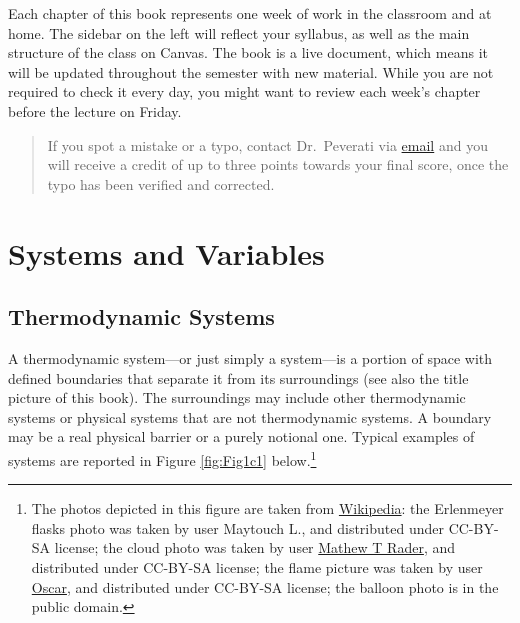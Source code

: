 \documentclass[
  9pt,
]{extbook}
\let\origdoublepage\cleardoublepage
\newcommand{\clearemptydoublepage}{%
  \clearpage
  {\pagestyle{empty}\origdoublepage}%
}
\let\cleardoublepage\clearemptydoublepage
\theoremstyle{definition}
\theoremstyle{definition}
\theoremstyle{definition}
\theoremstyle{remark}
\begin{document}
Each chapter of this book represents one week of work in the classroom and at home. The sidebar on the left will reflect your syllabus, as well as the main structure of the class on Canvas. The book is a live document, which means it will be updated throughout the semester with new material. While you are not required to check it every day, you might want to review each week's chapter before the lecture on Friday.

\begin{quote}
If you spot a mistake or a typo, contact Dr.~Peverati via \href{mailto:rpeverati@fit.edu}{email} and you will receive a credit of up to three points towards your final score, once the typo has been verified and corrected.
\end{quote}

\cleardoublepage
{}

\hypertarget{SystemVariables}{%
\chapter{Systems and Variables}\label{SystemVariables}}

\hypertarget{thermodynamic-systems}{%
\section{Thermodynamic Systems}\label{thermodynamic-systems}}

A thermodynamic system---or just simply a system---is a portion of space with defined boundaries that separate it from its surroundings (see also the title picture of this book). The surroundings may include other thermodynamic systems or physical systems that are not thermodynamic systems. A boundary may be a real physical barrier or a purely notional one. Typical examples of systems are reported in Figure \ref{fig:Fig1c1} below.\footnote{The photos depicted in this figure are taken from \href{https://en.wikipedia.org}{Wikipedia}: the Erlenmeyer flasks photo was taken by user Maytouch L., and distributed under CC-BY-SA license; the cloud photo was taken by user \href{https://commons.wikimedia.org/wiki/User:Matthew_T_Rader}{Mathew T Rader}, and distributed under CC-BY-SA license; the flame picture was taken by user \href{https://commons.wikimedia.org/wiki/User:Oscar}{Oscar}, and distributed under CC-BY-SA license; the balloon photo is in the public domain.}
\end{document}
